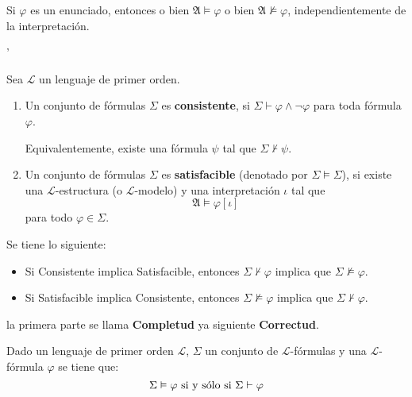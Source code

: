\documentclass[12pt]{report}
\newcounter{it}
\theoremstyle{largebreak}
\begin{document}
    \begin{obs}
        Si $\varphi$ es un enunciado, entonces o bien $\mathfrak{A}\vDash\varphi$ o bien $\mathfrak{A}\nvDash\varphi$, independientemente de la interpretación.
    \end{obs}

    '\begin{mydef}
        Sea $\mathcal{L}$ un lenguaje de primer orden.
        \begin{enumerate}
            \item Un conjunto de fórmulas $\Sigma$ es \textbf{consistente}, si $\Sigma\vdash\varphi\land\neg\varphi$ para toda fórmula $\varphi$.

            Equivalentemente, existe una fórmula $\psi$ tal que $\Sigma\nvdash\psi$.
            \item Un conjunto de fórmulas $\Sigma$ es \textbf{satisfacible} (denotado por $\Sigma\vDash\Sigma$), si existe una $\mathcal{L}$-estructura (o $\mathcal{L}$-modelo) y una interpretación $\iota$ tal que
            \begin{equation*}
                \mathfrak{A}\vDash\varphi[\iota]
            \end{equation*}
            para todo $\varphi\in\Sigma$.
        \end{enumerate}
    \end{mydef}

    \begin{obs}
        Se tiene lo siguiente:
        \begin{itemize}
            \item Si Consistente implica Satisfacible, entonces $\Sigma\nvdash\varphi$ implica que $\Sigma\nvDash\varphi$.
            \item Si Satisfacible implica Consistente, entonces $\Sigma\nvDash\varphi$ implica que $\Sigma\nvdash\varphi$.
        \end{itemize}
        la primera parte se llama \textbf{Completud} ya siguiente \textbf{Correctud}.
    \end{obs}

    \begin{theor}
        Dado un lenguaje de primer orden $\mathcal{L}$, $\Sigma$ un conjunto de $\mathcal{L}$-fórmulas y una $\mathcal{L}$-fórmula $\varphi$ se tiene que:
        \begin{equation*}
            \Sigma\vDash\varphi\textup{ si y sólo si }\Sigma\vdash\varphi
        \end{equation*}
    \end{theor}
\end{document}
